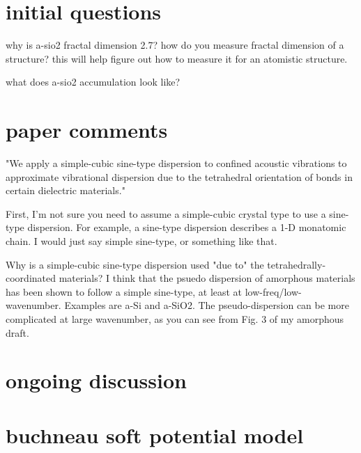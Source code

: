 \section{initial questions}
why is a-sio2 fractal dimension 2.7? how do you measure fractal dimension 
of a structure? this will help figure out how to measure it for an 
atomistic structure.

what does a-sio2 accumulation look like?

\section{paper comments}
"We apply a simple-cubic sine-type dispersion to confined acoustic 
vibrations to approximate vibrational dispersion due to the tetrahedral 
orientation of bonds in certain dielectric materials."

First, I'm not sure you need to assume a simple-cubic crystal type to 
use a sine-type dispersion. For example, a sine-type dispersion describes 
a 1-D monatomic chain. I would just say simple sine-type, or something 
like that.

Why is a simple-cubic sine-type dispersion used "due to" the 
tetrahedrally-coordinated materials? I think  that the psuedo dispersion 
of amorphous materials has been shown to follow a simple sine-type, at 
least at low-freq/low-wavenumber.  Examples are a-Si and a-SiO2. The 
pseudo-dispersion can be more complicated at large wavenumber, 
as you can see from Fig. 3 of my amorphous draft.


\section{ongoing discussion}

\section{buchneau soft potential model}
\cite{buchneau_interaction_1992}


